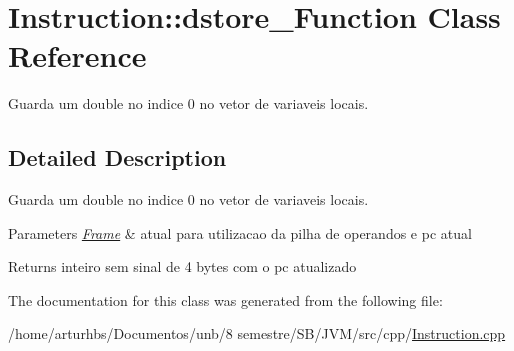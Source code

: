 \hypertarget{classInstruction_1_1dstore__0Function}{}\section{Instruction\+:\+:dstore\+\_\+Function Class Reference}
\label{classInstruction_1_1dstore__0Function}


Guarda um double no indice 0 no vetor de variaveis locais.  




\subsection{Detailed Description}
Guarda um double no indice 0 no vetor de variaveis locais. 


\begin{DoxyParams}{Parameters}
{\em \hyperlink{classFrame}{Frame}} & atual para utilizacao da pilha de operandos e pc atual \\
\hline
\end{DoxyParams}
\begin{DoxyReturn}{Returns}
inteiro sem sinal de 4 bytes com o pc atualizado 
\end{DoxyReturn}


The documentation for this class was generated from the following file\+:\begin{DoxyCompactItemize}
\item 
/home/arturhbs/\+Documentos/unb/8 semestre/\+S\+B/\+J\+V\+M/src/cpp/\hyperlink{Instruction_8cpp}{Instruction.\+cpp}\end{DoxyCompactItemize}
